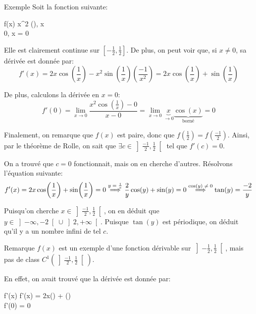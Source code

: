 \documentclass[a4paper]{article}
\begin{document}
\begin{parag}{Exemple}
    Soit la fonction suivante: 
    \begin{functionbypart}{f\left(x\right)}
        x^2 \cos\left(\right), \mathspace x  \\
        0, \mathspace x = 0
    \end{functionbypart}

    Elle est clairement continue sur $\left[-\frac{1}{2}, \frac{1}{2}\right]$. De plus, on peut voir que, si $x \neq 0$, sa dérivée est donnée par: 
    \[f'\left(x\right) = 2x\cos\left(\frac{1}{x}\right) - x^2 \sin\left(\frac{1}{x}\right) \left(\frac{-1}{x^2}\right) = 2x\cos\left(\frac{1}{x}\right) + \sin\left(\frac{1}{x}\right)\]

    De plus, calculons la dérivée en $x = 0$: 
    \[f'\left(0\right) = \lim_{x \to 0} \frac{x^2 \cos\left(\frac{1}{x}\right) - 0}{x - 0} = \lim_{x \to 0} \underbrace{x}_{\to 0} \underbrace{\cos\left(x\right)}_{\text{borné}} = 0\]
    
    Finalement, on remarque que $f\left(x\right)$ est paire, donc que $f\left(\frac{1}{2}\right) = f\left(\frac{-1}{2}\right)$. Ainsi, par le théorème de Rolle, on sait que $\exists c \in \left]\frac{-1}{2}, \frac{1}{2}\right[ $ tel que $f'\left(c\right) = 0$.

    On a trouvé que $c = 0$ fonctionnait, mais on en cherche d'autres. Résolvons l'équation suivante: 
    \[f'\left(x\right) = 2x\cos\left(\frac{1}{x}\right) + \sin\left(\frac{1}{x}\right) = 0 \over{\implies}{$y = \frac{1}{x}$}  \frac{2}{y} \cos\left(y\right) + \sin\left(y\right) = 0 \over{\implies}{$\cos\left(y\right) \neq 0$} \tan\left(y\right) = \frac{-2}{y} \]
    
    Puisqu'on cherche $x \in \left] \frac{-1}{2}, \frac{1}{2}\right[ $, on en déduit que $y \in \left]-\infty, -2\right[ \cup \left]2, +\infty\right[$. Puisque $\tan\left(y\right)$ est périodique, on déduit qu'il y a un nombre infini de tel $c$.

    \begin{subparag}{Remarque}
        $f\left(x\right)$ est un exemple d'une fonction dérivable sur $\left]-\frac{1}{2}, \frac{1}{2}\right[ $, mais pas de class $C^1\left(\left]\frac{-1}{2}, \frac{1}{2}\right[ \right)$.

        En effet, on avait trouvé que la dérivée est donnée par: 
        \begin{functionbypart}{f'\left(x\right)}
            f'\left(x\right) = 2x\cos\left(\right) + \sin\left(\right) \\
            f'\left(0\right) = 0
        \end{functionbypart}


\end{subparag}
\end{parag}
\end{document}
